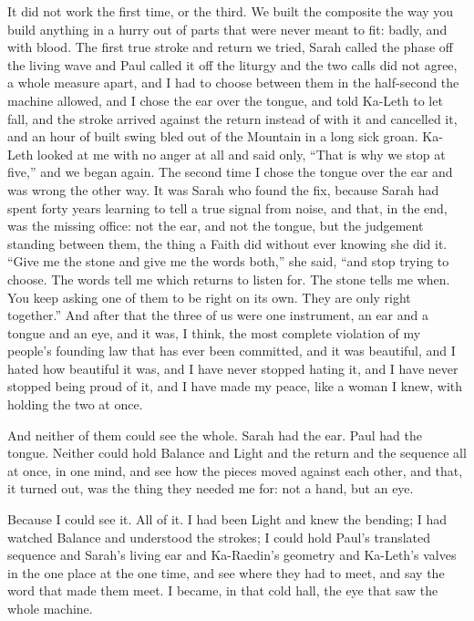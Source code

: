 It did not work the first time, or the third. We built the composite the way you build anything in a hurry out of parts that were never meant to fit: badly, and with blood. The first true stroke and return we tried, Sarah called the phase off the living wave and Paul called it off the liturgy and the two calls did not agree, a whole measure apart, and I had to choose between them in the half-second the machine allowed, and I chose the ear over the tongue, and told Ka-Leth to let fall, and the stroke arrived against the return instead of with it and cancelled it, and an hour of built swing bled out of the Mountain in a long sick groan. Ka-Leth looked at me with no anger at all and said only, ``That is why we stop at five,'' and we began again. The second time I chose the tongue over the ear and was wrong the other way. It was Sarah who found the fix, because Sarah had spent forty years learning to tell a true signal from noise, and that, in the end, was the missing office: not the ear, and not the tongue, but the judgement standing between them, the thing a Faith did without ever knowing she did it. ``Give me the stone and give me the words both,'' she said, ``and stop trying to choose. The words tell me which returns to listen for. The stone tells me when. You keep asking one of them to be right on its own. They are only right together.'' And after that the three of us were one instrument, an ear and a tongue and an eye, and it was, I think, the most complete violation of my people's founding law that has ever been committed, and it was beautiful, and I hated how beautiful it was, and I have never stopped hating it, and I have never stopped being proud of it, and I have made my peace, like a woman I knew, with holding the two at once.\par

And neither of them could see the whole. Sarah had the ear. Paul had the tongue. Neither could hold Balance and Light and the return and the sequence all at once, in one mind, and see how the pieces moved against each other, and that, it turned out, was the thing they needed me for: not a hand, but an eye.\par

Because I could see it. All of it. I had been Light and knew the bending; I had watched Balance and understood the strokes; I could hold Paul's translated sequence and Sarah's living ear and Ka-Raedin's geometry and Ka-Leth's valves in the one place at the one time, and see where they had to meet, and say the word that made them meet. I became, in that cold hall, the eye that saw the whole machine.\par

